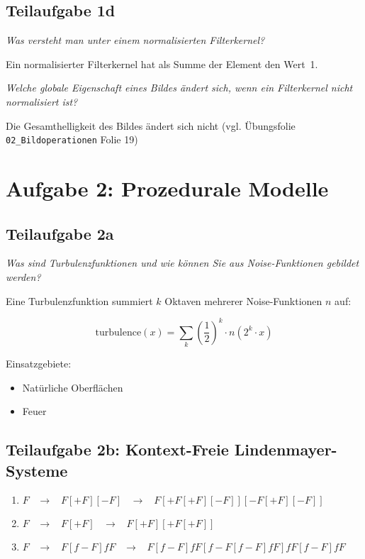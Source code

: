 \documentclass[a4paper]{scrartcl}
\begin{document}
\subsection*{Teilaufgabe 1d}
\textit{Was versteht man unter einem normalisierten Filterkernel?}

Ein normalisierter Filterkernel hat als Summe der Element den Wert~1.

\textit{Welche globale Eigenschaft eines Bildes ändert sich, wenn ein Filterkernel nicht normalisiert ist?}

Die Gesamthelligkeit des Bildes ändert sich nicht (vgl. Übungsfolie \texttt{02\_Bildoperationen} Folie 19)

\clearpage
\section*{Aufgabe 2: Prozedurale Modelle}
\subsection*{Teilaufgabe 2a}
\textit{Was sind Turbulenzfunktionen und wie können Sie aus Noise-Funktionen gebildet werden?}

Eine Turbulenzfunktion summiert $k$ Oktaven mehrerer Noise-Funktionen $n$ auf:

\[\text{turbulence}(x) = \sum_k \left (\frac{1}{2} \right )^k \cdot n(2^k \cdot x)\]

Einsatzgebiete:

\begin{itemize}
    \item Natürliche Oberflächen
    \item Feuer
\end{itemize}

\subsection*{Teilaufgabe 2b: Kontext-Freie Lindenmayer-Systeme}

\begin{enumerate}[label=(\arabic*)]
    \item $F \;\;\;\rightarrow\;\;\;F [+F][-F]\;\;\;\rightarrow\;\;\;F [+F [+F][-F]] [-F [+F][-F]]$
    \item $F \;\;\;\rightarrow\;\;\;F[+F]\;\;\;\rightarrow\;\;\;F[+F][+F[+F]]$
    \item $F \;\;\;\rightarrow\;\;\;F [f - F] fF\;\;\;\rightarrow\;\;\;F [f - F] fF [f - F [f - F] fF] fF [f - F] fF$
\end{enumerate}
\end{document}
